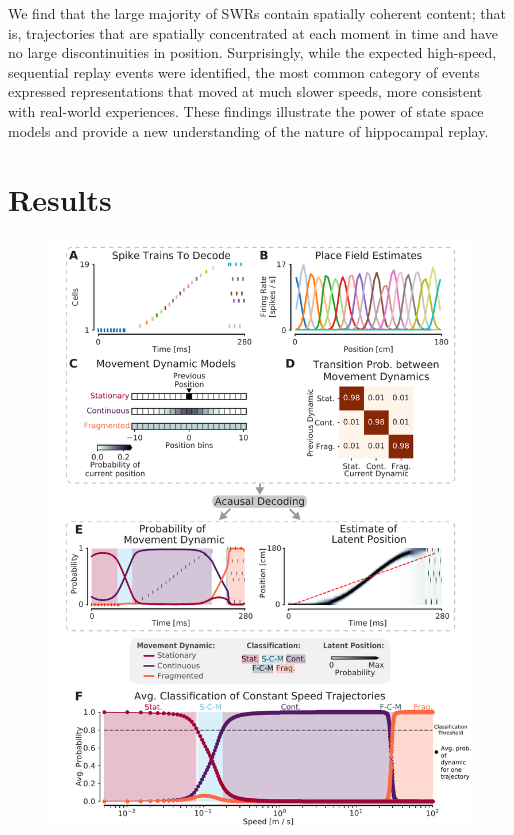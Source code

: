 \documentclass[9pt,lineno]{elife}
\begin{document}
We find that the large majority of SWRs contain spatially coherent content; that is, trajectories that are spatially concentrated at each moment in time and have no large discontinuities in position. Surprisingly, while the expected high-speed, sequential replay events were identified, the most common category of events expressed representations that moved at much slower speeds, more consistent with real-world experiences. These findings illustrate the power of state space models and provide a new understanding of the nature of hippocampal replay.

\section*{Results}

\begin{figure}
\includegraphics[width=0.75\linewidth]{figures/Figure1/Figure1_v7}

\end{figure}
\end{document}
